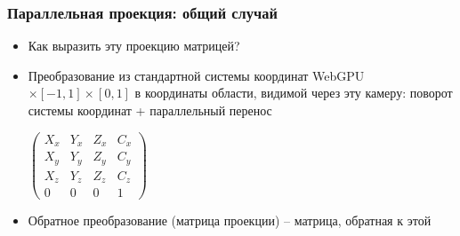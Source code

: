 \documentclass[10pt]{beamer}
\begin{document}
\begin{frame}[fragile]
\frametitle{Параллельная проекция: общий случай}
\begin{itemize}
\item Как выразить эту проекцию матрицей?
\pause
\item Преобразование из стандартной системы координат WebGPU \begin{math}[-1, 1]\times[-1, 1]\times[0, 1]\end{math} в координаты области, видимой через эту камеру: поворот системы координат + параллельный перенос
\begin{center}
\begin{math}
\begin{pmatrix}
X_x & Y_x & Z_x & C_x \\
X_y & Y_y & Z_y & C_y \\
X_z & Y_z & Z_z & C_z \\
0 & 0 & 0 & 1
\end{pmatrix}
\end{math}
\end{center}
\pause
\item Обратное преобразование (матрица проекции) -- матрица, обратная к этой
\end{itemize}
\end{frame}
\end{document}
